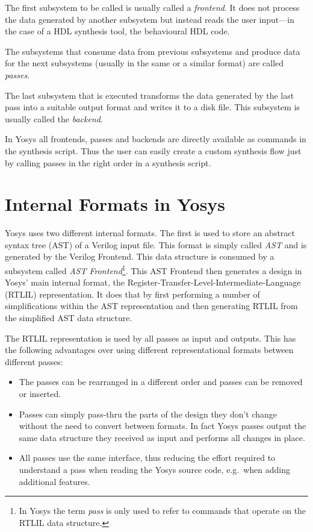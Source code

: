 The first subsystem to be called is usually called a {\it frontend}. It does not process the data generated by
another subsystem but instead reads the user input---in the case of a HDL synthesis tool, the behavioural
HDL code.

The subsystems that consume data from previous subsystems and produce data for the next subsystems (usually in the
same or a similar format) are called {\it passes}.

The last subsystem that is executed transforms the data generated by the last pass into a suitable output
format and writes it to a disk file. This subsystem is usually called the {\it backend}.

In Yosys all frontends, passes and backends are directly available as commands in the synthesis script. Thus
the user can easily create a custom synthesis flow just by calling passes in the right order in a synthesis
script.

\section{Internal Formats in Yosys}

Yosys uses two different internal formats. The first is used to store an abstract syntax tree (AST) of a Verilog
input file. This format is simply called {\it AST} and is generated by the Verilog Frontend. This data structure
is consumed by a subsystem called {\it AST Frontend}\footnote{In Yosys the term {\it pass} is only used to
refer to commands that operate on the RTLIL data structure.}. This AST Frontend then generates a design in Yosys'
main internal format, the Register-Transfer-Level-Intermediate-Language (RTLIL) representation. It does that
by first performing a number of simplifications within the AST representation and then generating RTLIL from
the simplified AST data structure.

The RTLIL representation is used by all passes as input and outputs. This has the following advantages over
using different representational formats between different passes:

\begin{itemize}
\item The passes can be rearranged in a different order and passes can be removed or inserted.
\item Passes can simply pass-thru the parts of the design they don't change without the need
      to convert between formats. In fact Yosys passes output the same data structure they received
      as input and performs all changes in place.
\item All passes use the same interface, thus reducing the effort required to understand a pass
      when reading the Yosys source code, e.g.~when adding additional features.
\end{itemize}

